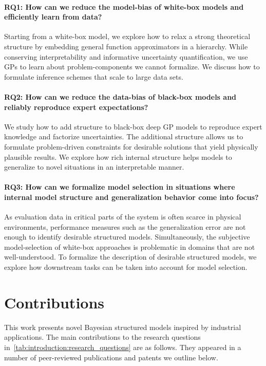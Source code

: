 \paragraph{RQ1: How can we reduce the model-bias of white-box models and efficiently learn from data?}
Starting from a white-box model, we explore how to relax a strong theoretical structure by embedding general function approximators in a hierarchy.
While conserving interpretability and informative uncertainty quantification, we use GPs to learn about problem-components we cannot formalize.
We discuss how to formulate inference schemes that scale to large data sets.

\paragraph{RQ2: How can we reduce the data-bias of black-box models and reliably reproduce expert expectations?}
We study how to add structure to black-box deep GP models to reproduce expert knowledge and factorize uncertainties.
The additional structure allows us to formulate problem-driven constraints for desirable solutions that yield physically plausible results.
We explore how rich internal structure helps models to generalize to novel situations in an interpretable manner.

\paragraph{RQ3: How can we formalize model selection in situations where internal model structure and generalization behavior come into focus?}
As evaluation data in critical parts of the system is often scarce in physical environments, performance measures such as the generalization error are not enough to identify desirable structured models.
Simultaneously, the subjective model-selection of white-box approaches is problematic in domains that are not well-understood.
To formalize the description of desirable structured models, we explore how downstream tasks can be taken into account for model selection.

\section{Contributions}
This work presents novel Bayesian structured models inspired by industrial applications.
The main contributions to the research questions in~\cref{tab:introduction:research_questions} are as follows.
They appeared in a number of peer-reviewed publications and patents we outline below.

